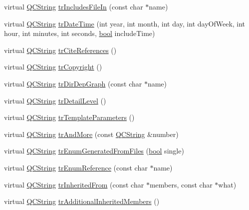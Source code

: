 \begin{DoxyCompactItemize}
\item 
virtual \hyperlink{class_q_c_string}{Q\+C\+String} \hyperlink{class_translator_greek_a4b21b094a8626f71fad02cfec6fb243e}{tr\+Includes\+File\+In} (const char $\ast$name)
\item 
virtual \hyperlink{class_q_c_string}{Q\+C\+String} \hyperlink{class_translator_greek_a3570152536e37ff51b9c660f72c27d4f}{tr\+Date\+Time} (int year, int month, int day, int day\+Of\+Week, int hour, int minutes, int seconds, \hyperlink{qglobal_8h_a1062901a7428fdd9c7f180f5e01ea056}{bool} include\+Time)
\item 
virtual \hyperlink{class_q_c_string}{Q\+C\+String} \hyperlink{class_translator_greek_a54adea7d74a346cd8e75bca56cba492f}{tr\+Cite\+References} ()
\item 
virtual \hyperlink{class_q_c_string}{Q\+C\+String} \hyperlink{class_translator_greek_a4a609170471165d9d23deccca5344930}{tr\+Copyright} ()
\item 
virtual \hyperlink{class_q_c_string}{Q\+C\+String} \hyperlink{class_translator_greek_a43c9deea936a4f0c0d4fda118f36f521}{tr\+Dir\+Dep\+Graph} (const char $\ast$name)
\item 
virtual \hyperlink{class_q_c_string}{Q\+C\+String} \hyperlink{class_translator_greek_a454dd6d523be69b77963252a6037dca2}{tr\+Detail\+Level} ()
\item 
virtual \hyperlink{class_q_c_string}{Q\+C\+String} \hyperlink{class_translator_greek_a35c1deba9bd237da80d6483544046c77}{tr\+Template\+Parameters} ()
\item 
virtual \hyperlink{class_q_c_string}{Q\+C\+String} \hyperlink{class_translator_greek_ad9b5d1ec791b3097993f1b01ea6ade97}{tr\+And\+More} (const \hyperlink{class_q_c_string}{Q\+C\+String} \&number)
\item 
virtual \hyperlink{class_q_c_string}{Q\+C\+String} \hyperlink{class_translator_greek_a58e142d40f39efcf9b22a3267cf8619c}{tr\+Enum\+Generated\+From\+Files} (\hyperlink{qglobal_8h_a1062901a7428fdd9c7f180f5e01ea056}{bool} single)
\item 
virtual \hyperlink{class_q_c_string}{Q\+C\+String} \hyperlink{class_translator_greek_a6055ee92b04946218e7a55c0235d1314}{tr\+Enum\+Reference} (const char $\ast$name)
\item 
virtual \hyperlink{class_q_c_string}{Q\+C\+String} \hyperlink{class_translator_greek_ac8f28d145edbab7e7498ba47ab89025e}{tr\+Inherited\+From} (const char $\ast$members, const char $\ast$what)
\item 
virtual \hyperlink{class_q_c_string}{Q\+C\+String} \hyperlink{class_translator_greek_a64fd58b24240fc6ffe848cd892d5048d}{tr\+Additional\+Inherited\+Members} ()

\end{DoxyCompactItemize}

